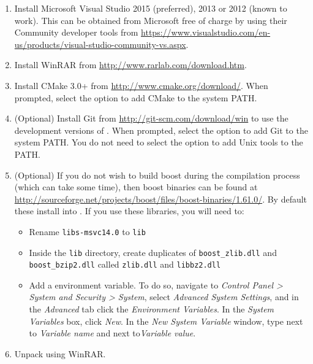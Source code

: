 \begin{enumerate}
  \item Install Microsoft Visual Studio 2015 (preferred), 2013 or 2012 (known to
  work). This can be obtained from Microsoft free of charge by using their
  Community developer tools from
  \url{https://www.visualstudio.com/en-us/products/visual-studio-community-vs.aspx}.
  \item Install WinRAR from \url{http://www.rarlab.com/download.htm}.
  \item Install CMake 3.0+ from \url{http://www.cmake.org/download/}. When
  prompted, select the option to add CMake to the system PATH.
  \item (Optional) Install Git from \url{http://git-scm.com/download/win} to use
  the development versions of \nekpp. When prompted, select the option to add
  Git to the system PATH. You do not need to select the option to add Unix tools
  to the PATH.
  \item (Optional) If you do not wish to build boost during the compilation
  process (which can take some time), then boost binaries can be found at
  \url{http://sourceforge.net/projects/boost/files/boost-binaries/1.61.0/}. By
  default these install into . If you use these libraries, you will need to:
  \begin{itemize}
    \item Rename \texttt{libs-msvc14.0} to \texttt{lib}
    \item Inside the \texttt{lib} directory, create duplicates of
    \texttt{boost\_zlib.dll} and \texttt{boost\_bzip2.dll} called
    \texttt{zlib.dll} and \texttt{libbz2.dll}
	\item Add a  environment variable. To do so,
	navigate to \emph{Control Panel > System and Security > System}, select
	\emph{Advanced System Settings}, and in the \emph{Advanced} tab click the
	\emph{Environment Variables}. In the \emph{System Variables} box, click
	\emph{New}. In the \emph{New System Variable} window, type 
	next to \emph{Variable name} and  next to\emph{Variable value}.
  \end{itemize}
  \item Unpack  using WinRAR.


\end{enumerate}
